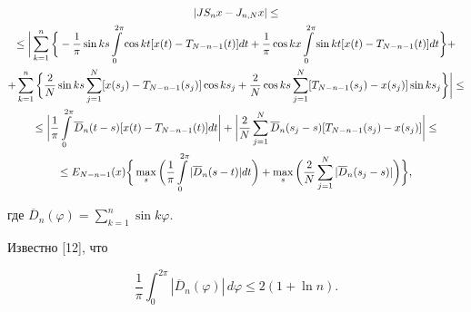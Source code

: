 \begin{pf}
\begin{gather}
|JS_nx-J_{n,N}x| \leq\notag \\


%


\leq\bigg|\sum_{k=1}^n\bigg\{-\frac{1}{\pi}\sin


ks\int\limits_0^{2\pi}\cos


kt[x(t)-T_{N-n-1}(t)]dt+\frac{1}{\pi} \cos


kx\int\limits_0^{2\pi}\sin


kt[x(t)-T_{N-n-1}(t)]dt\bigg\}+\notag \\


%


+ \sum_{k=1}^n\bigg\{\frac{2}{N}\sin ks 


\sum_{j=1}^N[x(s_j)-T_{N-n-1}(s_j)]


\cos ks_j +\frac{2}{N} \cos ks


\sum_{j=1}^N[T_{N-n-1}(s_j)-x(s_j)]\sin


ks_j\bigg\}\bigg|\leq \notag \\


%


\leq\bigg|\frac{1}{\pi}\int\limits_0^{2\pi}


\overline{D}_n(t-s)[x(t)-T_{N-n-1}(t)]


dt\bigg|+\bigg|\frac{2}{N}\sum_{j=1}^N


\overline{D}_n(s_j-s)[T_{N-n-1}


(s_j)-x(s_j)]\bigg|\leq \notag \\


%


\label{eq17}


\leq E_{N-n-1}(x)\bigg\{\max_s\bigg(\frac{1}{\pi}


\int\limits_0^{2\pi}|\overline{D}_n(s-t)|


dt\bigg) + \max_s\bigg( \frac{2}{N}


\sum_{j=1}^N|\overline{D}_n(s_j-s)|\bigg)\bigg\},


\end{gather}


где $\overline{D}_n(\varphi)=\sum\limits_{k=1}^n\sin k\varphi$.





Известно [12], что


\begin{equation}\label{eq18}


\frac{1}{\pi}\int_0^{2\pi}|\overline{D}_n(\varphi)|


\,d\varphi\leq 2(1+\ln n).



\end{equation}
\end{pf}
